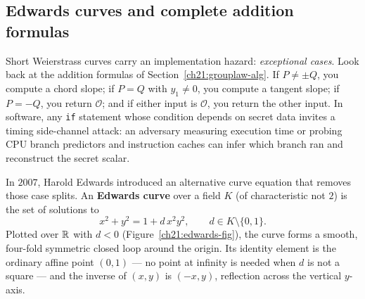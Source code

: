 \subsection{Edwards curves and complete addition formulas}
\label{ch21:edwards}

Short Weierstrass curves carry an implementation hazard: \emph{exceptional cases}.
Look back at the addition formulas of Section~\ref{ch21:grouplaw-alg}. If $P \neq \pm Q$,
you compute a chord slope; if $P = Q$ with $y_1 \neq 0$, you compute a tangent slope; if
$P = -Q$, you return $\mathcal{O}$; and if either input is $\mathcal{O}$, you return the
other input. In software, any \texttt{if} statement whose condition depends on secret data
invites a timing side-channel attack: an adversary measuring execution time or probing CPU
branch predictors and instruction caches can infer which branch ran and reconstruct the
secret scalar.

In $2007$, Harold Edwards introduced an alternative curve equation that removes those case
splits. An \textbf{Edwards curve} over a field $K$ (of characteristic not $2$) is the set
of solutions to
\begin{equation}
\label{ch21:edwards-eq}
x^2 + y^2 = 1 + d\,x^2 y^2, \qquad d \in K \setminus \{0, 1\}.
\end{equation}
Plotted over $\mathbb{R}$ with $d < 0$ (Figure~\ref{ch21:edwards-fig}), the curve forms a smooth,
four-fold symmetric closed loop around the origin. Its identity element is the ordinary
affine point $(0, 1)$ --- no point at infinity is needed when $d$ is not a square --- and
the inverse of $(x, y)$ is $(-x, y)$, reflection across the vertical $y$-axis.

